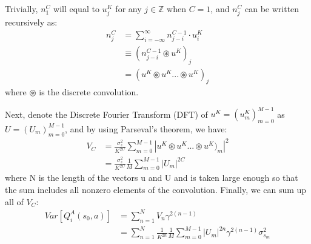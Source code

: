 Trivially, \begin{math}n^C_{1}\end{math} will equal to \begin{math}u^K_{j}\end{math} for any \begin{math}j\in\mathbb{Z}\end{math} when \begin{math}C=1\end{math}, and \begin{math}n^C_{j}\end{math} can be written  recursively as:
\[
\begin{aligned}
n^C_{j} &=\sum^\infty_{i=-\infty}n^{C-1}_{j-i}\cdot u^K_{i}\\
        &\equiv(n^{C-1}_{j-i}\circledast u^K)_j\\
        &=(u^K\circledast u^K...\circledast u^K)_j
\end{aligned}
\]
where \begin{math}\circledast\end{math} is the discrete convolution.
\par Next, denote the Discrete Fourier Transform (DFT) of \begin{math}u^K=(u^K_{m})^{M-1}_{m=0}\end{math} as \begin{math}U=(U_{m})^{M-1}_{m=0}\end{math}, and by using Parseval’s theorem, we have:
\[
\begin{aligned}
V_C &=\frac{\sigma^2_z}{K^{2C}}\sum^{M-1}_{m=0}|u^K\circledast u^K...\circledast u^K)_{m}|^2\\
    &=\frac{\sigma^2_z}{K^{2C}}\frac{1}{M}\sum^{M-1}_{m=0}|U_{m}|^{2C}
\end{aligned}
\]
where N is the length of the vectors u and U and is taken large enough so that the sum includes all nonzero elements of the convolution. Finally, we can sum up all of $V_C$:
\[
\begin{aligned}
Var[Q^A_{i}(s_{0},a)]   &=\sum^N_{n=1}V_n\gamma^{2(n-1)}\\
                        &=\sum^N_{n=1}\frac{1}{K^{2n}}\frac{1}{M}\sum^{M-1}_{m=0}|U_{m}|^{2n}\gamma^{2(n-1)}\sigma^2_{s_{m}}
\end{aligned}
\]
